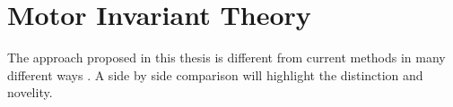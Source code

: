 %

\section{Motor Invariant Theory}

The approach proposed in this thesis is different from current \cms methods in many different ways .
A side by side comparison will highlight the distinction and novelity. 

